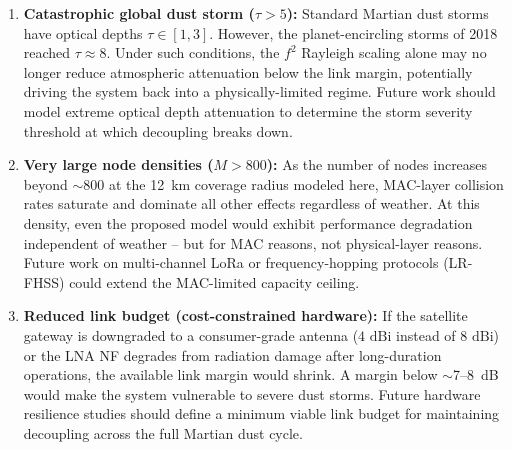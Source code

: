 \documentclass[journal,10pt,doublecolumn]{IEEEtran}
\begin{document}
\begin{enumerate}
    \item \textbf{Catastrophic global dust storm ($\tau > 5$):} Standard Martian dust storms have optical depths $\tau \in [1, 3]$. However, the planet-encircling storms of 2018 reached $\tau \approx 8$. Under such conditions, the $f^2$ Rayleigh scaling alone may no longer reduce atmospheric attenuation below the link margin, potentially driving the system back into a physically-limited regime. Future work should model extreme optical depth attenuation to determine the storm severity threshold at which decoupling breaks down.

    \item \textbf{Very large node densities ($M > 800$):} As the number of nodes increases beyond $\sim$800 at the 12~km coverage radius modeled here, MAC-layer collision rates saturate and dominate all other effects regardless of weather. At this density, even the proposed model would exhibit performance degradation independent of weather -- but for MAC reasons, not physical-layer reasons. Future work on multi-channel LoRa or frequency-hopping protocols (LR-FHSS) \cite{alvarez2022uplink} could extend the MAC-limited capacity ceiling.

    \item \textbf{Reduced link budget (cost-constrained hardware):} If the satellite gateway is downgraded to a consumer-grade antenna ($4\text{ dBi}$ instead of $8\text{ dBi}$) or the LNA NF degrades from radiation damage after long-duration operations, the available link margin would shrink. A margin below $\sim$7--8~dB would make the system vulnerable to severe dust storms. Future hardware resilience studies should define a minimum viable link budget for maintaining decoupling across the full Martian dust cycle.
\end{enumerate}
\end{document}
